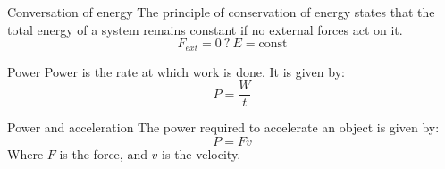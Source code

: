 \documentclass{article}
\begin{document}
\begin{theorem}
    {Conversation of energy}
    The principle of conservation of energy states that the total energy of a system remains constant if no external forces act on it.
    \[F_{ext}=0\ ?\ E=\text{const}\]
\end{theorem}

\begin{definition}
    {Power}
    Power is the rate at which work is done. It is given by:
    \[P=\frac{W}{t}\]
\end{definition}

\begin{theorem}
    {Power and acceleration}
    The power required to accelerate an object is given by:
    \[P=Fv\]
    Where $F$ is the force, and $v$ is the velocity.
\end{theorem}
\end{document}
